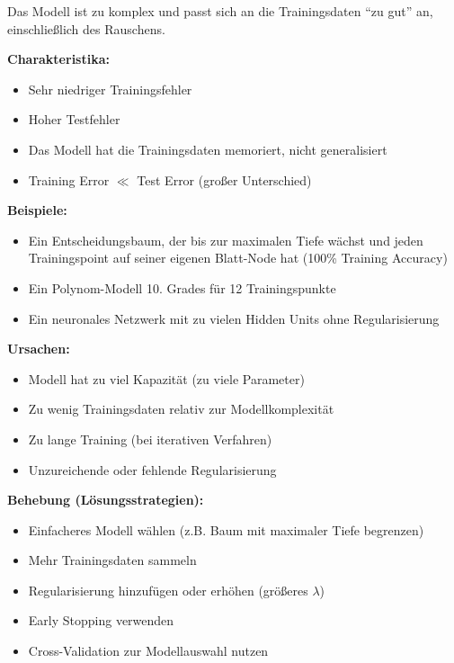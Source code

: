 Das Modell ist zu komplex und passt sich an die Trainingsdaten ``zu gut'' an, einschließlich des Rauschens.

\textbf{Charakteristika:}
\begin{itemize}[leftmargin=1.5em]
    \item Sehr niedriger Trainingsfehler
    \item Hoher Testfehler
    \item Das Modell hat die Trainingsdaten memoriert, nicht generalisiert
    \item Training Error $\ll$ Test Error (großer Unterschied)
\end{itemize}

\textbf{Beispiele:}
\begin{itemize}[leftmargin=1.5em]
    \item Ein Entscheidungsbaum, der bis zur maximalen Tiefe wächst und jeden Trainingspoint auf seiner eigenen Blatt-Node hat (100\% Training Accuracy)
    \item Ein Polynom-Modell 10. Grades für 12 Trainingspunkte
    \item Ein neuronales Netzwerk mit zu vielen Hidden Units ohne Regularisierung
\end{itemize}

\textbf{Ursachen:}
\begin{itemize}[leftmargin=1.5em]
    \item Modell hat zu viel Kapazität (zu viele Parameter)
    \item Zu wenig Trainingsdaten relativ zur Modellkomplexität
    \item Zu lange Training (bei iterativen Verfahren)
    \item Unzureichende oder fehlende Regularisierung
\end{itemize}

\textbf{Behebung (Lösungsstrategien):}
\begin{itemize}[leftmargin=1.5em]
    \item Einfacheres Modell wählen (z.B. Baum mit maximaler Tiefe begrenzen)
    \item Mehr Trainingsdaten sammeln
    \item Regularisierung hinzufügen oder erhöhen (größeres $\lambda$)
    \item Early Stopping verwenden
    \item Cross-Validation zur Modellauswahl nutzen
\end{itemize}

